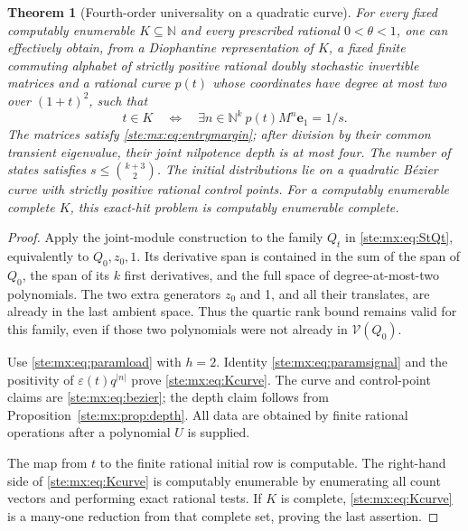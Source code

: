 \documentclass[11pt,letterpaper]{article}
\newtheorem{theorem}{Theorem}[section]
\theoremstyle{definition}
\theoremstyle{remark}
\newcommand{\N}{\mathbb N}
\newcommand{\e}{\mathbf e}
\newcommand{\calV}{\mathcal V}
\begin{document}
\begin{theorem}[Fourth-order universality on a quadratic curve]\label{ste:mx:thm:curve}
For every fixed computably enumerable $K\subseteq\N$ and every prescribed
rational $0<\theta<1$, one can effectively obtain, from a Diophantine
representation of $K$, a fixed finite commuting alphabet of strictly positive
rational doubly stochastic invertible matrices and a rational curve $p(t)$
whose coordinates have degree at most two over $(1+t)^2$, such that
\begin{equation}\label{ste:mx:eq:Kcurve}
 t\in K\quad\Longleftrightarrow\quad
 \exists n\in\N^k\ p(t)M^n\e_1=1/s.
\end{equation}
The matrices satisfy \eqref{ste:mx:eq:entrymargin}; after division by their common
transient eigenvalue, their joint nilpotence depth is at most four. The number
of states satisfies $s\leq\binom{k+3}{2}$. The initial distributions lie on a
quadratic B\'ezier curve with strictly positive rational control points.
For a computably enumerable complete $K$, this exact-hit problem is
computably enumerable complete.
\end{theorem}
\begin{proof}
Apply the joint-module construction to the family $Q_t$ in
\eqref{ste:mx:eq:StQt}, equivalently to $Q_0,z_0,1$. Its derivative span is contained
in the sum of the span of $Q_0$, the span of its $k$ first derivatives, and
the full space of degree-at-most-two polynomials. The two extra generators
$z_0$ and 1, and all their translates, are already in the last ambient space.
Thus the quartic rank bound remains valid for this family, even if those two
polynomials were not already in $\calV(Q_0)$.

Use \eqref{ste:mx:eq:paramload} with $h=2$. Identity \eqref{ste:mx:eq:paramsignal} and the
positivity of $\varepsilon(t)q^{|n|}$ prove \eqref{ste:mx:eq:Kcurve}. The curve and
control-point claims are \eqref{ste:mx:eq:bezier}; the depth claim follows from
Proposition~\ref{ste:mx:prop:depth}. All data are obtained by finite rational
operations after a polynomial $U$ is supplied.

The map from $t$ to the finite rational initial row is computable. The
right-hand side of \eqref{ste:mx:eq:Kcurve} is computably enumerable by enumerating
all count vectors and performing exact rational tests. If $K$ is complete,
\eqref{ste:mx:eq:Kcurve} is a many-one reduction from that complete set, proving the
last assertion.
\end{proof}
\end{document}
